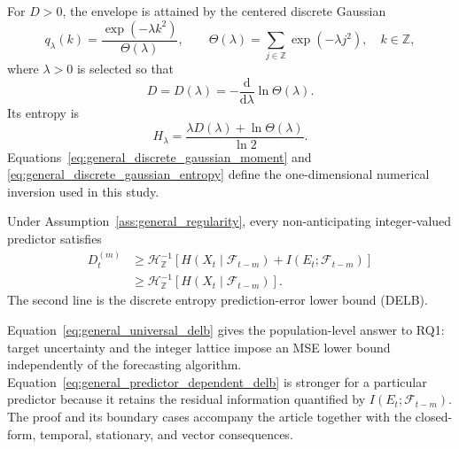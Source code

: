 For \(D>0\), the envelope is attained by the centered discrete Gaussian
\begin{equation}
q_\lambda(k)
=
\frac{\exp(-\lambda k^2)}{\Theta(\lambda)},
\qquad
\Theta(\lambda)=\sum_{j\in\mathbb Z}\exp(-\lambda j^2),
\quad k\in\mathbb Z,
\label{eq:general_discrete_gaussian}
\end{equation}
where \(\lambda>0\) is selected so that
\begin{equation}
D=D(\lambda)
=-\frac{\mathrm d}{\mathrm d\lambda}\ln\Theta(\lambda).
\label{eq:general_discrete_gaussian_moment}
\end{equation}
Its entropy is
\begin{equation}
H_\lambda
=
\frac{\lambda D(\lambda)+\ln\Theta(\lambda)}{\ln2}.
\label{eq:general_discrete_gaussian_entropy}
\end{equation}
Equations~\eqref{eq:general_discrete_gaussian_moment} and
\eqref{eq:general_discrete_gaussian_entropy} define the one-dimensional
numerical inversion used in this study.

\begin{Theorem}
\label{thm:exact_delb}
Under Assumption~\ref{ass:general_regularity}, every non-anticipating integer-valued
predictor satisfies
\begin{align}
D_t^{(m)}
&\geq
\mathcal H_{\mathbb Z}^{-1}\!\left[
H(X_t\mid\mathcal F_{t-m})
+I(E_t;\mathcal F_{t-m})
\right]
\label{eq:general_predictor_dependent_delb}\\
&\geq
\mathcal H_{\mathbb Z}^{-1}\!\left[
H(X_t\mid\mathcal F_{t-m})
\right].
\label{eq:general_universal_delb}
\end{align}
The second line is the discrete entropy prediction-error lower bound
(DELB).
\end{Theorem}

Equation~\eqref{eq:general_universal_delb} gives the population-level answer
to RQ1: target uncertainty and the integer lattice impose an MSE lower bound
independently of the forecasting algorithm.
Equation~\eqref{eq:general_predictor_dependent_delb} is stronger for a
particular predictor because it retains the residual information quantified
by \(I(E_t;\mathcal F_{t-m})\). The proof and its boundary cases accompany
the article together with the closed-form, temporal, stationary, and vector
consequences.

